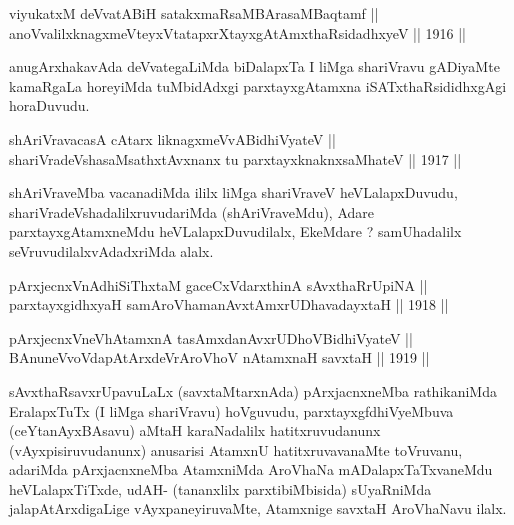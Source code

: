 \begin{shl}
viyukatxM deVvatABiH satakxmaRsaMBArasaMBaqtamf || \\
anoVvalilxknagxmeVteyxVtatapxrXtayxgAtAmxthaRsidadhxyeV ||  1916 ||  
\end{shl}

\begin{artha}
anugArxhakavAda deVvategaLiMda biDalapxTa I liMga shariVravu gADiyaMte
kamaRgaLa horeyiMda tuMbidAdxgi parxtayxgAtamxna iSATxthaRsididhxgAgi
horaDuvudu.
\end{artha}


\begin{shl}
shAriVravacasA cAtarx liknagxmeVvABidhiVyateV || \\
shariVradeVshasaMsathxtAvxnanx tu parxtayxknaknxsaMhateV ||  1917 ||  
\end{shl}

\begin{artha}
shAriVraveMba vacanadiMda ililx liMga shariVraveV heVLalapxDuvudu,
shariVradeVshadalilxruvudariMda (shAriVraveMdu), Adare
parxtayxgAtamxneMdu heVLalapxDuvudilalx, EkeMdare ? samUhadalilx
seVruvudilalxvAdadxriMda alalx.
\end{artha}


\begin{shl}
pArxjecnxVnAdhiSiThxtaM gaceCxVdarxthinA sAvxthaRrUpiNA || \\
parxtayxgidhxyaH samAroVhamanAvxtAmx\s \s rUDhavadayxtaH ||  1918 ||  
\end{shl}

\begin{shl}
pArxjecnxVneVhA\s \s tamxnA tasAmxdanAvxrUDhoV\s BidhiVyateV ||  \\
\footnotemark[1]BAnuneVvoVdapAtArxdeVrAroVhoV nA\s \s tamxnaH savxtaH ||  1919 ||  
\end{shl}

\begin{artha}
sAvxthaRsavxrUpavuLaLx (savxtaMtarxnAda) pArxjacnxneMba
rathikaniMda EralapxTuTx (I liMga shariVravu) hoVguvudu, parxtayxgfdhiVyeMbuva (ceYtanAyxBAsavu) aMtaH karaNadalilx hatitxruvudanunx (vAyxpisiruvudanunx) anusarisi AtamxnU hatitxruvavanaMte toVruvanu, adariMda pArxjacnxneMba AtamxniMda AroVhaNa mADalapxTaTxvaneMdu heVLalapxTiTxde, udAH- (tananxlilx parxtibiMbisida) sUyaRniMda jalapAtArxdigaLige vAyxpaneyiruvaMte, Atamxnige savxtaH AroVhaNavu ilalx. 
\end{artha}

